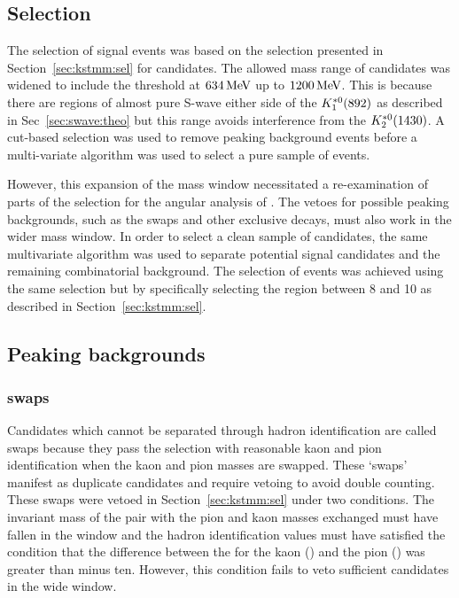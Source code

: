 \subsection{Selection}
\label{sec:swave:meas:sel}

The selection of signal \BdToKpimm events was based on the selection presented 
in Section~\ref{sec:kstmm:sel} for \BdToKstmm candidates.
The allowed mass range of \kpi candidates was widened to include the \kpi threshold at $634\mathrm{\,Me\kern -0.1em V}$ up to $1200\mathrm{\,Me\kern -0.1em V}$.
This is because there are regions of almost pure S-wave either side of the $K^{*0}_{1}(892)$ as described in Sec~\ref{sec:swave:theo} 
but this range avoids interference from the $K^{*0}_{2}(1430)$.
A cut-based selection was used to remove peaking background events before a multi-variate algorithm
was used to select a pure sample of \BdToKpimm events.

However, this expansion of the \kpi mass window necessitated a 
re-examination of parts of the selection for the angular analysis of \BdToKstmm. 
The vetoes for possible peaking backgrounds, such as the \ktopi swaps and other exclusive \bquark decays,
must also work in the wider \kpi mass window.
In order to select a clean sample of \BdToKpimm candidates, the same multivariate algorithm was 
used to separate potential signal candidates and the remaining combinatorial background.
The selection of \BdToJpsiKpi events was achieved using the same selection but by specifically selecting the \qsq region between 8 and 10 \gevgevcccc
as described in Section~\ref{sec:kstmm:sel}.

\subsection{Peaking backgrounds}

\subsubsection{\ktopi swaps}

Candidates which cannot be separated through hadron identification are called \ktopi swaps because they pass the selection 
with reasonable kaon and pion identification when  the kaon and pion masses are swapped.
These `swaps' manifest as duplicate candidates and require vetoing to avoid double counting.
These \ktopi swaps were vetoed in Section~\ref{sec:kstmm:sel} under two conditions. 
The invariant mass of the \kpi pair with the pion and kaon masses exchanged must have fallen in the \kpi window
and the hadron identification values must have satisfied the condition that the difference between the \dllkpi for the kaon (\kdllkpi) and the pion (\pidllkpi) was greater than minus ten.
However, this condition fails to veto sufficient candidates in the wide \kpi window. 

